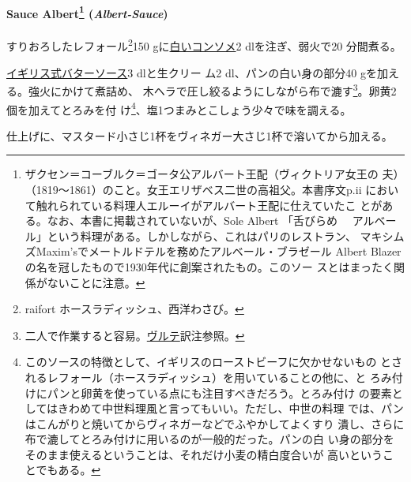 \begin{recette}
\hypertarget{albert-sauce}{%
\paragraph[Sauce Albert (\emph{Albert-Sauce})]{\texorpdfstring{Sauce
Albert\footnote{ザクセン＝コーブルク＝ゴータ公アルバート王配（ヴィクトリア女王の
  夫）（1819〜1861）のこと。女王エリザベス二世の高祖父。本書序文p.ii
  において触れられている料理人エルーイがアルバート王配に仕えていたこ
  とがある。なお、本書に掲載されていないが、Sole Albert 「舌びらめ　
  アルベール」という料理がある。しかしながら、これはパリのレストラン、
  マキシムズMaxim'sでメートルドテルを務めたアルベール・ブラゼール Albert
  Blazerの名を冠したもので1930年代に創案されたもの。このソー
  スとはまったく関係がないことに注意。}
(\emph{Albert-Sauce})}{Sauce Albert (Albert-Sauce)}}\label{albert-sauce}}

 
  
 

すりおろしたレフォール\footnote{raifort ホースラディッシュ、西洋わさび。}150
gに\protect\hyperlink{}{白いコンソメ}2 dlを注ぎ、弱火で20 分間煮る。

\protect\hyperlink{sauce-au-beurre-a-l-anglaise}{イギリス式バターソース}3
dlと生クリー ム2\undemi{} dl、パンの白い身の部分40
gを加える。強火にかけて煮詰め、
木ヘラで圧し絞るようにしながら布で漉す\footnote{二人で作業すると容易。\protect\hyperlink{veloute}{ヴルテ}訳注参照。}。卵黄2個を加えてとろみを付
け\footnote{このソースの特徴として、イギリスのローストビーフに欠かせないもの
  とされるレフォール（ホースラディッシュ）を用いていることの他に、と
  ろみ付けにパンと卵黄を使っている点にも注目すべきだろう。とろみ付け
  の要素としてはきわめて中世料理風と言ってもいい。ただし、中世の料理
  では、パンはこんがりと焼いてからヴィネガーなどでふやかしてよくすり
  潰し、さらに布で漉してとろみ付けに用いるのが一般的だった。パンの白
  い身の部分をそのまま使えるということは、それだけ小麦の精白度合いが
  高いということでもある。}、塩1つまみとこしょう少々で味を調える。

仕上げに、マスタード小さじ1杯をヴィネガー大さじ1杯で溶いてから加える。


\end{recette}
